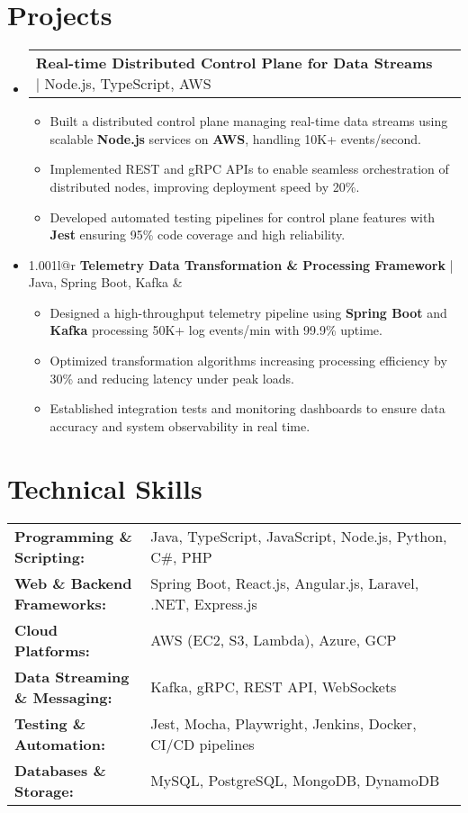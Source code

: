 \documentclass[letterpaper,11pt]{article}
\makeatletter
\newcommand{\resumeItem}[1]{
  \item\footnotesize{
    {#1 \vspace{-2pt}}
  }
}
\newcommand{\resumeProjectHeading}[2]{
    \item
    \begin{tabular*}{1.001\textwidth}{l@{\extracolsep{\fill}}r}
      \small#1 & \textbf{\small #2}\\
    \end{tabular*}\vspace{-7pt}
}
\newcommand{\resumeSubHeadingListStart}{\begin{itemize}[leftmargin=0pt, label={}]}
\newcommand{\resumeSubHeadingListEnd}{\end{itemize}}
\newcommand{\resumeItemListStart}{\begin{itemize}[leftmargin=*]}
\newcommand{\resumeItemListEnd}{\end{itemize}\vspace{-5pt}}
\makeatother
\begin{document}
\section{Projects}
    \vspace{-5pt}
    \resumeSubHeadingListStart
      \resumeProjectHeading
          {\textbf{Real-time Distributed Control Plane for Data Streams} | Node.js, TypeScript, AWS}{}
          \resumeItemListStart
              \resumeItem{Built a distributed control plane managing real-time data streams using scalable \textbf{Node.js} services on \textbf{AWS}, handling 10K+ events/second.}
              \resumeItem{Implemented REST and gRPC APIs to enable seamless orchestration of distributed nodes, improving deployment speed by 20\%.}
              \resumeItem{Developed automated testing pipelines for control plane features with \textbf{Jest} ensuring 95\% code coverage and high reliability.}
          \resumeItemListEnd
          \vspace{-16pt}
      \resumeProjectHeading
          {\textbf{Telemetry Data Transformation & Processing Framework} | Java, Spring Boot, Kafka}{}
          \resumeItemListStart
              \resumeItem{Designed a high-throughput telemetry pipeline using \textbf{Spring Boot} and \textbf{Kafka} processing 50K+ log events/min with 99.9\% uptime.}
              \resumeItem{Optimized transformation algorithms increasing processing efficiency by 30\% and reducing latency under peak loads.}
              \resumeItem{Established integration tests and monitoring dashboards to ensure data accuracy and system observability in real time.}
          \resumeItemListEnd 
    \resumeSubHeadingListEnd
\vspace{-10pt}
\section{Technical Skills}
        \vspace{-14pt}
        \begin{table}[h]
            \footnotesize
            \begin{tabular}{p{0.3\linewidth} p{0.7\linewidth}}
                \textbf{Programming \& Scripting:} & Java, TypeScript, JavaScript, Node.js, Python, C\#, PHP \\
                \textbf{Web \& Backend Frameworks:} & Spring Boot, React.js, Angular.js, Laravel, .NET, Express.js \\
                \textbf{Cloud Platforms:} & AWS (EC2, S3, Lambda), Azure, GCP \\
                \textbf{Data Streaming \& Messaging:} & Kafka, gRPC, REST API, WebSockets \\
                \textbf{Testing \& Automation:} & Jest, Mocha, Playwright, Jenkins, Docker, CI/CD pipelines \\
                \textbf{Databases \& Storage:} & MySQL, PostgreSQL, MongoDB, DynamoDB \\
            \end{tabular}
        \end{table}
\end{document}
